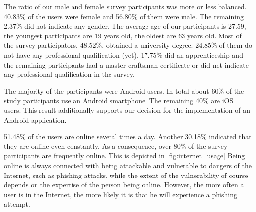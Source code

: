 \begin{description}[leftmargin=0cm]
	\item[General Information] The ratio of our male and female survey participants was more or less balanced.
 40.83\% of the users were female and 56.80\% of them were male.
 The remaining 2.37\% did not indicate any gender.
 The average age of our participants is 27.59, the youngest participants are 19 years old, the oldest are 63 years old.
 Most of the survey participators, 48.52\%, obtained a university degree.
 24.85\% of them do not have any professional qualification (yet). 17.75\% did an apprenticeship and the remaining participants had a master craftsman certificate or did not indicate any professional qualification in the survey.
	
	\item[High Rate of Android Users] The majority of the participants were Android users.
 In total about 60\% of the study participants use an Android smartphone.
 The remaining 40\% are iOS users.
 This result additionally supports our decision for the implementation of an Android application.

	\item[High Internet Usage Frequency] 51.48\% of the users are online several times a day.
 Another 30.18\% indicated that they are online even constantly.
 As a consequence, over 80\% of the survey participants are frequently online.
 This is depicted in \autoref{fig:internet_usage} Being online is always connected with being attackable and vulnerable to dangers of the Internet, such as phishing attacks, while the extent of the vulnerability of course depends on the expertise of the person being online.
 However, the more often a user is in the Internet, the more likely it is that he will experience a phishing attempt.


\end{description}
